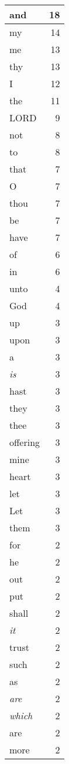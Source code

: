 \begin{center}
\begin{longtable}{l|r}
\hline \hline
\endlastfoot
and & 18 \\ \hline
my & 14 \\ \hline
me & 13 \\ \hline
thy & 13 \\ \hline
I & 12 \\ \hline
the & 11 \\ \hline
LORD & 9 \\ \hline
not & 8 \\ \hline
to & 8 \\ \hline
that & 7 \\ \hline
O & 7 \\ \hline
thou & 7 \\ \hline
be & 7 \\ \hline
have & 7 \\ \hline
of & 6 \\ \hline
in & 6 \\ \hline
unto & 4 \\ \hline
God & 4 \\ \hline
up & 3 \\ \hline
upon & 3 \\ \hline
a & 3 \\ \hline
\emph{is} & 3 \\ \hline
hast & 3 \\ \hline
they & 3 \\ \hline
thee & 3 \\ \hline
offering & 3 \\ \hline
mine & 3 \\ \hline
heart & 3 \\ \hline
let & 3 \\ \hline
Let & 3 \\ \hline
them & 3 \\ \hline
for & 2 \\ \hline
he & 2 \\ \hline
out & 2 \\ \hline
put & 2 \\ \hline
shall & 2 \\ \hline
\emph{it} & 2 \\ \hline
trust & 2 \\ \hline
such & 2 \\ \hline
as & 2 \\ \hline
\emph{are} & 2 \\ \hline
\emph{which} & 2 \\ \hline
are & 2 \\ \hline
more & 2 \\ \hline

\end{longtable}
\end{center}
